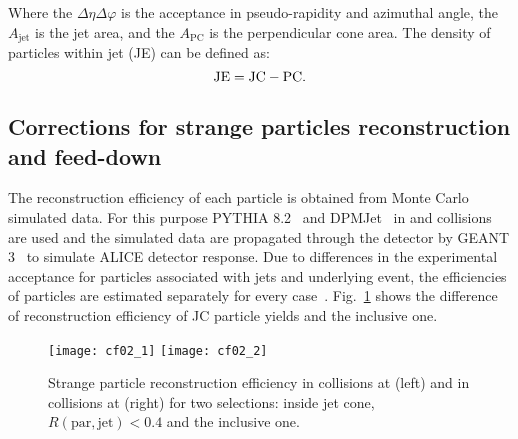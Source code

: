 \documentclass[ALICE,manyauthors]{cernphprep}
\begin{document}
Where the $\Delta\eta\Delta\varphi$ is the acceptance in pseudo-rapidity and azimuthal angle, the $A_\mathrm{jet}$ is the jet area, and the $A_\mathrm{PC}$ is the perpendicular cone area.
The density of particles within jet (JE) can be defined as:
\begin{equation}
\label{eq:je}
	{\rm JE = JC - PC}.
\end{equation}

\subsection{Corrections for strange particles reconstruction and feed-down}
\label{SubSec:Correction}
The reconstruction efficiency of each particle is obtained from Monte Carlo simulated data.
For this purpose PYTHIA 8.2~\cite{Sjostrand:2014zea} and DPMJet~\cite{Roesler:2000he} in \pp and \pPb collisions are used and the simulated data are propagated through the detector by GEANT 3~\cite{Brun:1994aa} to simulate ALICE detector response.
Due to differences in the experimental acceptance for particles associated with jets and underlying event, the efficiencies of particles are estimated separately for every case~\cite{Acharya:2021oaa}.
Fig.~\ref{fig:EffiJCIncl} shows the difference of reconstruction efficiency of JC particle yields and the inclusive one.
\begin{figure}[!ht]
	\begin{center}
		\texttt{[image: cf02\_1]}
		\texttt{[image: cf02\_2]}
	\end{center}
	\caption{Strange particle reconstruction efficiency in \pp collisions at \thirteen (left) and in \pPb collisions at \fivenn (right) for two selections: inside jet cone, $R(\mathrm{par, jet}) < 0.4$ and the inclusive one.}
	\label{fig:EffiJCIncl}
\end{figure}
\end{document}
